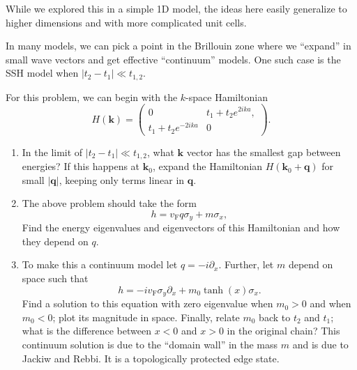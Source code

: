 \documentclass{jhwhw}
\begin{document}
While we explored this in a simple 1D model, the ideas here easily generalize to higher dimensions and with more complicated unit cells.



In many models, we can pick a point in the Brillouin zone where we ``expand'' in small wave vectors and get effective ``continuum'' models.
One such case is the SSH model when $|t_{2}-t_{1}|\ll t_{1,2}$.

For this problem, we can begin with the $k$-space Hamiltonian
\begin{equation}
  \label{eq:2}
  H(\mathbf k) =
  \begin{pmatrix}
    0 & t_{1} + t_{2} e^{2 i  k a} ,\\
t_{1} + t_{2} e^{-2 i k a}  & 0
  \end{pmatrix}.
\end{equation}
\begin{enumerate}
  \item In the limit of $|t_{2}-t_{1}|\ll t_{1,2}$, what $\mathbf k$ vector has the smallest gap between energies? If this happens at $\mathbf k_{0}$, expand the Hamiltonian $H(\mathbf k_{0} + \mathbf q)$  for small $|\mathbf q|$, keeping only terms linear in $\mathbf q$.
  \item The above problem should take the form
        \begin{equation}
          \label{eq:3}
          h = v_{\mathrm F} q \sigma_{y} + m \sigma_{x},
        \end{equation}
        Find the energy eigenvalues and eigenvectors of this Hamiltonian and how they depend on $q$.
  \item To make this a continuum model let $q = -i\partial_{x}$. Further, let $m$ depend on space such that
        \begin{equation}
          \label{eq:4}
          h = -i v_{\mathrm F} \sigma_{y} \partial_{x} + m_{0} \tanh(x) \sigma_{x}.
        \end{equation}
        Find a solution to this equation with zero eigenvalue when $m_{0}>0$ and when $m_{0}<0$;  plot its magnitude in space. Finally, relate $m_{0}$ back to $t_{2}$ and $t_{1}$; what is the difference between $x<0$ and $x>0$ in the original chain? This continuum solution is due to the ``domain wall'' in the mass $m$ and is due to Jackiw and Rebbi. It is a topologically protected edge state.
\end{enumerate}


\end{document}
